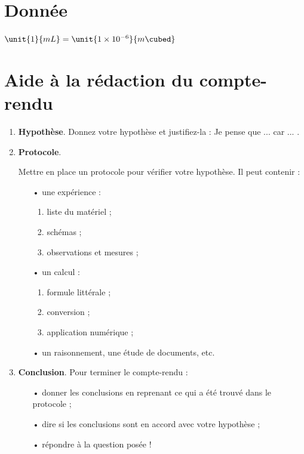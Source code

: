 \documentclass[12pt,a4paper]{article}
\begin{document}
\section*{Donnée}

$ \unit{1}{mL} = \unit{1\times 10^{-6}}{m\cubed}$

\section*{Aide à la rédaction du compte-rendu}

\begin{enumerate}
\item \textbf{Hypothèse}. Donnez votre hypothèse et justifiez-la : \og Je pense que ... car ... \fg{}. \hfill \anarai{}

\item \textbf{Protocole}. \hfill \app{} \anarai{} \rea{}

Mettre en place un protocole pour vérifier votre hypothèse. Il peut contenir :
\begin{itemize}
\item[•] une expérience :
\begin{enumerate}
\item liste du matériel ;
\item schémas ;
\item observations et mesures ;
\end{enumerate}
\item[•] un calcul :
\begin{enumerate}
\item formule littérale ;
\item conversion ;
\item application numérique ;
\end{enumerate}
\item[•] un raisonnement, une étude de documents, etc.
\end{itemize}
\item \textbf{Conclusion}. Pour terminer le compte-rendu : \hfill \val{}
\begin{itemize}
\item[•] donner les conclusions en reprenant ce qui a été trouvé dans le protocole ;
\item[•] dire si les conclusions sont en accord avec votre hypothèse ;
\item[•] répondre à la question posée !
\end{itemize}
\end{enumerate}
\end{document}
